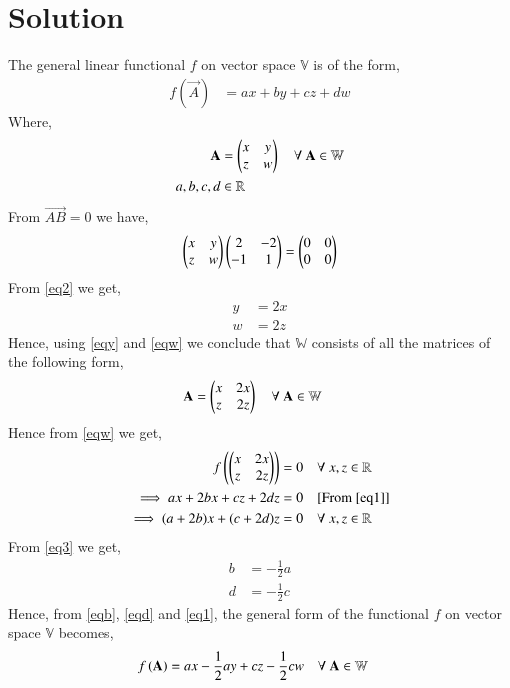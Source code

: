 \documentclass[journal,12pt,twocolumn]{IEEEtran}
\begin{document}
\section{\textbf{Solution}}
The general linear functional $f$ on vector space $\mathbb{V}$ is of the form,
\begin{align}
f(\vec{A}) &= ax +by +cz +dw\label{eq1}
\end{align}
Where,
\begin{align}
\mathbf{A} &= \begin{pmatrix}x&y\\z&w\end{pmatrix} \quad{\text{$\forall$ $\mathbf{A} \in \mathbb{W}$}}\\
a,b,c,d &\in \mathbb{R}
\end{align}
From $\vec{AB} = 0$ we have,
\begin{align}
\begin{pmatrix}x&y\\z&w\end{pmatrix}\begin{pmatrix}2&-2\\-1&1\end{pmatrix} = \begin{pmatrix}0&0\\0&0\end{pmatrix}\label{eq2}
\end{align}
From \eqref{eq2} we get,
\begin{align}
y &= 2x\label{eqy}\\
w &= 2z\label{eqw}
\end{align}
Hence, using \eqref{eqy} and \eqref{eqw} we conclude that $\mathbb{W}$ consists of all the matrices of the following form,
\begin{align}
\mathbf{A} &= \begin{pmatrix}x&2x\\z&2z\end{pmatrix} \quad{\text{$\forall$ $\mathbf{A} \in \mathbb{W}$}}\label{eqw}
\end{align}
Hence from \eqref{eqw} we get,
\begin{align}
f\left(\begin{pmatrix}x&2x\\z&2z\end{pmatrix}\right) &= 0 \quad{\text{$\forall$ $x,z \in \mathbb{R}$}}\\
\implies ax+2bx+cz+2dz &= 0 \quad{\text{[From \eqref{eq1}]}}\\
\implies (a+2b)x+(c+2d)z &= 0 \quad{\text{$\forall$ $x,z \in \mathbb{R}$}}\label{eq3}
\end{align}
From \eqref{eq3} we get,
\begin{align}
b &= -\frac{1}{2}a\label{eqb}\\
d &= -\frac{1}{2}c\label{eqd}
\end{align}
Hence, from \eqref{eqb}, \eqref{eqd} and \eqref{eq1}, the general form of the functional $f$ on vector space $\mathbb{V}$ becomes,
\begin{align}
f\left(\mathbf{A}\right) &= ax -\frac{1}{2}ay+cz-\frac{1}{2}cw \quad{\text{$\forall$ $\mathbf{A} \in \mathbb{W}$}}\label{eqGen}
\end{align}
\end{document}
